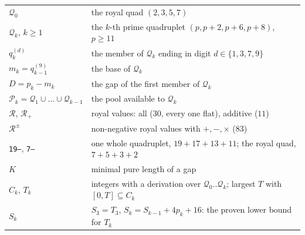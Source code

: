 \documentclass[11pt,a4paper]{article}
\newcommand{\Q}{\mathcal{Q}}
\newcommand{\Pool}{\mathcal{P}}
\newcommand{\R}{\mathcal{R}}
\newcommand{\Radd}{\mathcal{R}_{+}}
\newcommand{\code}[1]{\texttt{#1}}
\begin{document}
\begin{small}
\begin{tabular}{ll}
\toprule
$\Q_0$ & the royal quad $(2,3,5,7)$ \\
$\Q_k$, $k\ge1$ & the $k$-th prime quadruplet $(p,p+2,p+6,p+8)$, $p\ge11$ \\
$q_k^{(d)}$ & the member of $\Q_k$ ending in digit $d\in\{1,3,7,9\}$ \\
$m_k=q_{k-1}^{(9)}$ & the base of $\Q_k$ \\
$D=p_k-m_k$ & the gap of the first member of $\Q_k$ \\
$\Pool_k=\Q_1\cup\dots\cup\Q_{k-1}$ & the pool available to $\Q_k$ \\
$\R$, $\Radd$ & royal values: all ($30$, every one flat), additive ($11$) \\
$\R^{\pm}$ & non-negative royal values with $+,-,\times$ ($83$) \\
\code{19--}, \code{7--} & one whole quadruplet, $19+17+13+11$; the royal quad, $7+5+3+2$ \\
$K$ & minimal pure length of a gap \\
$C_k$, $T_k$ & integers with a derivation over $\Q_0..\Q_k$; largest $T$ with $[0,T]\subseteq C_k$ \\
$S_k$ & $S_3=T_3$, $S_k=S_{k-1}+4p_k+16$: the proven lower bound for $T_k$ \\
\bottomrule
\end{tabular}
\end{small}
\end{document}
